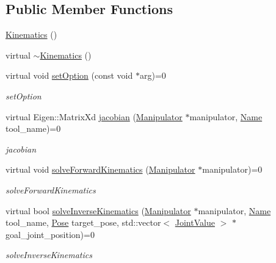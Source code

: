 \subsection*{Public Member Functions}
\begin{DoxyCompactItemize}
\item 
\hyperlink{classrobotis__manipulator_1_1_kinematics_a3d08da271bc5cce3cafa2d331277cc5d}{Kinematics} ()
\item 
virtual \hyperlink{classrobotis__manipulator_1_1_kinematics_a202eda8d94a06263cf5d729dd51e59ab}{$\sim$\+Kinematics} ()
\item 
virtual void \hyperlink{classrobotis__manipulator_1_1_kinematics_adc048ff10f7707e3ced3143e583983bc}{set\+Option} (const void $\ast$arg)=0
\begin{DoxyCompactList}\small\item\em set\+Option \end{DoxyCompactList}\item 
virtual Eigen\+::\+Matrix\+Xd \hyperlink{classrobotis__manipulator_1_1_kinematics_a8644b348452df2f0a46b00aadc36c218}{jacobian} (\hyperlink{classrobotis__manipulator_1_1_manipulator}{Manipulator} $\ast$manipulator, \hyperlink{namespacerobotis__manipulator_a08c2d25e77a01ad75b9bb740f8ce4765}{Name} tool\+\_\+name)=0
\begin{DoxyCompactList}\small\item\em jacobian \end{DoxyCompactList}\item 
virtual void \hyperlink{classrobotis__manipulator_1_1_kinematics_adfdd3727052c27d12e3fc2209c025317}{solve\+Forward\+Kinematics} (\hyperlink{classrobotis__manipulator_1_1_manipulator}{Manipulator} $\ast$manipulator)=0
\begin{DoxyCompactList}\small\item\em solve\+Forward\+Kinematics \end{DoxyCompactList}\item 
virtual bool \hyperlink{classrobotis__manipulator_1_1_kinematics_a6065cf1bff763854b9a0bd62945a093b}{solve\+Inverse\+Kinematics} (\hyperlink{classrobotis__manipulator_1_1_manipulator}{Manipulator} $\ast$manipulator, \hyperlink{namespacerobotis__manipulator_a08c2d25e77a01ad75b9bb740f8ce4765}{Name} tool\+\_\+name, \hyperlink{structrobotis__manipulator_1_1_pose}{Pose} target\+\_\+pose, std\+::vector$<$ \hyperlink{namespacerobotis__manipulator_aa0556c98c5294ccf3a96c2d0fe315e40}{Joint\+Value} $>$ $\ast$goal\+\_\+joint\+\_\+position)=0
\begin{DoxyCompactList}\small\item\em solve\+Inverse\+Kinematics \end{DoxyCompactList}\end{DoxyCompactItemize}


